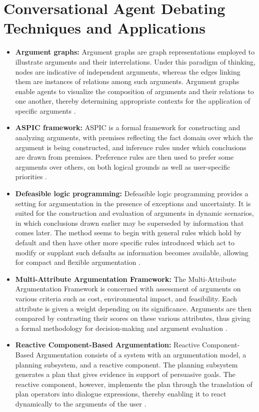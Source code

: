 \documentclass[conference]{IEEEtran}
\begin{document}
\section{Conversational Agent Debating Techniques and Applications}
\begin{itemize}
    \item \textbf{Argument graphs:} Argument graphs are graph representations employed to illustrate arguments and their interrelations. Under this paradigm of thinking, nodes are indicative of independent arguments, whereas the edges linking them are instances of relations among such arguments. Argument graphs enable agents to visualize the composition of arguments and their relations to one another, thereby determining appropriate contexts for the application of specific arguments \cite{b4}\cite{b6}.
    \item \textbf{ASPIC framework:} ASPIC is a formal framework for constructing and analyzing arguments, with premises reflecting the fact domain over which the argument is being constructed, and inference rules under which conclusions are drawn from premises. Preference rules are then used to prefer some arguments over others, on both logical grounds as well as user-specific priorities \cite{b6}.
    \item \textbf{Defeasible logic programming:} Defeasible logic programming provides a setting for argumentation in the presence of exceptions and uncertainty. It is suited for the construction and evaluation of arguments in dynamic scenarios, in which conclusions drawn earlier may be superseded by information that comes later. The method seems to begin with general rules which hold by default and then have other more specific rules introduced which act to modify or supplant such defaults as information becomes available, allowing for compact and flexible argumentation \cite{b6}.
    \item \textbf{Multi-Attribute Argumentation Framework:} The Multi-Attribute Argumentation Framework is concerned with assessment of arguments on various criteria such as cost, environmental impact, and feasibility. Each attribute is given a weight depending on its significance. Arguments are then compared by contrasting their scores on these various attributes, thus giving a formal methodology for decision-making and argument evaluation \cite{b6}.
    \item \textbf{Reactive Component-Based Argumentation:} Reactive Component-Based Argumentation consists of a system with an argumentation model, a planning subsystem, and a reactive component. The planning subsystem generates a plan that gives evidence in support of persuasive goals. The reactive component, however, implements the plan through the translation of plan operators into dialogue expressions, thereby enabling it to react dynamically to the arguments of the user \cite{b7}.

\end{itemize}
\end{document}
